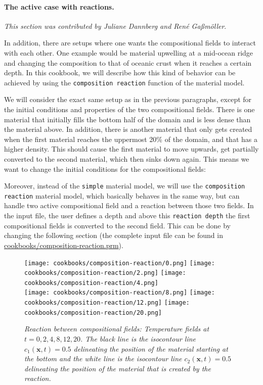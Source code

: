 \documentclass{article}
\begin{document}
\paragraph{The active case with reactions.}

\textit{This section was contributed by Juliane Dannberg and Ren{\'e} Ga{\ss}m{\"o}ller}.

In addition, there are setups where one wants the compositional fields to interact with each other. One example would be material upwelling at a mid-ocean ridge and changing the composition to that of oceanic crust when it reaches a certain depth. In this cookbook, we will describe how this kind of behavior can be achieved by using the \texttt{composition reaction} function of the material model. 

We will consider the exact same setup as in the previous paragraphs, except for the initial conditions and properties of the two compositional fields. There is one material that initially fills the bottom half of the domain and is less dense than the material above. In addition, there is another material that only gets created when the first material reaches the uppermost 20\% of the domain, and that has a higher density. This should cause the first material to move upwards, get partially converted to the second material, which then sinks down again. This means we want to change the initial conditions for the compositional fields: 




Moreover, instead of the \texttt{simple} material model, we will use the \texttt{composition reaction} material model, which basically behaves in the same way, but can handle two active compositional field and a reaction between those two fields. In the input file, the user defines a depth and above this \texttt{reaction depth} the first compositional fields is converted to the second field. This can be done by changing the following section (the complete input file can be found in \url{cookbooks/composition-reaction.prm}). 



\begin{figure}
  \centering
  \texttt{[image: cookbooks/composition-reaction/0.png]}
  \hfill
  \texttt{[image: cookbooks/composition-reaction/2.png]}
  \hfill
  \texttt{[image: cookbooks/composition-reaction/4.png]}
  \\[6pt]
  \texttt{[image: cookbooks/composition-reaction/8.png]}
  \hfill
  \texttt{[image: cookbooks/composition-reaction/12.png]}
  \hfill
  \texttt{[image: cookbooks/composition-reaction/20.png]}
  \caption{\it Reaction between compositional fields: Temperature fields at $t=0, 2, 4, 8,
  12, 20$. The black line is the isocontour line $c_1(\mathbf x,t)=0.5$
    delineating the position of the material starting at the bottom and the white line is the    isocontour line $c_2(\mathbf x,t)=0.5$
    delineating the position of the material that is created by the reaction.}
  \label{fig:composition-reaction}
\end{figure}
\end{document}
